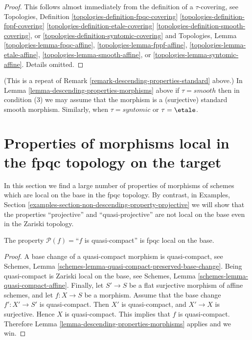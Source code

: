\begin{proof}
This follows almost immediately from the definition of
a $\tau$-covering, see
Topologies, Definition
\ref{topologies-definition-fpqc-covering}
\ref{topologies-definition-fppf-covering}
\ref{topologies-definition-etale-covering}
\ref{topologies-definition-smooth-covering}, or
\ref{topologies-definition-syntomic-covering}
and Topologies, Lemma
\ref{topologies-lemma-fpqc-affine},
\ref{topologies-lemma-fppf-affine},
\ref{topologies-lemma-etale-affine},
\ref{topologies-lemma-smooth-affine}, or
\ref{topologies-lemma-syntomic-affine}.
Details omitted.
\end{proof}

\begin{remark}
\label{remark-descending-properties-morphisms-standard}
(This is a repeat of Remark \ref{remark-descending-properties-standard} above.)
In Lemma \ref{lemma-descending-properties-morphisms} above if
$\tau = smooth$ then in condition (3) we may assume that
the morphism is a (surjective) standard smooth morphism.
Similarly, when $\tau = syntomic$ or $\tau = \etale$.
\end{remark}




\section{Properties of morphisms local in the fpqc topology on the target}
\label{section-descending-properties-morphisms-fpqc}

\noindent
In this section we find a large number of properties
of morphisms of schemes which are local on the base
in the fpqc topology. By contrast, in
Examples, Section \ref{examples-section-non-descending-property-projective}
we will show that the properties ``projective'' and ``quasi-projective''
are not local on the base even in the Zariski topology.

\begin{lemma}
\label{lemma-descending-property-quasi-compact}
The property $\mathcal{P}(f) =$``$f$ is quasi-compact''
is fpqc local on the base.
\end{lemma}

\begin{proof}
A base change of a quasi-compact morphism is quasi-compact, see
Schemes, Lemma \ref{schemes-lemma-quasi-compact-preserved-base-change}.
Being quasi-compact is Zariski local on the base, see
Schemes, Lemma \ref{schemes-lemma-quasi-compact-affine}.
Finally, let
$S' \to S$ be a flat surjective morphism of affine schemes,
and let $f : X \to S$ be a morphism. Assume that the base change
$f' : X' \to S'$ is quasi-compact. Then $X'$ is quasi-compact,
and $X' \to X$ is surjective. Hence $X$ is quasi-compact.
This implies that $f$ is quasi-compact.
Therefore Lemma \ref{lemma-descending-properties-morphisms} applies and we win.
\end{proof}

